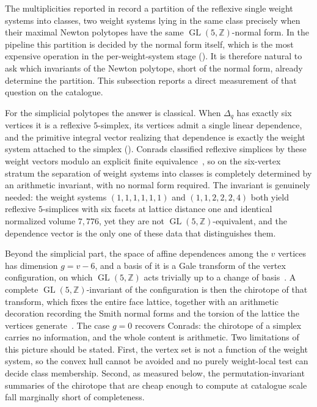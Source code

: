 \documentclass[appliedmath,article,submit,moreauthors]{Definitions/mdpi}
\newcommand{\Z}{\mathbb{Z}}
\newcommand{\GL}{\operatorname{GL}}
\newcommand{\Dq}{\Delta_q}
\begin{document}
The multiplicities reported in  record a
partition of the reflexive single weight systems into classes, two weight
systems lying in the same class precisely when their maximal Newton polytopes
have the same \(\GL(5,\Z)\)-normal form. In the pipeline this partition is
decided by the normal form itself, which is the most expensive operation in the
per-weight-system stage (). It is therefore natural to ask
which invariants of the Newton polytope, short of the normal form, already
determine the partition. This subsection reports a direct measurement of that
question on the catalogue.

For the simplicial polytopes the answer is classical. When \(\Dq\) has exactly
six vertices it is a reflexive \(5\)-simplex, its vertices admit a single
{\color{blue}linear} dependence, and the primitive integral vector realizing
that dependence is exactly the weight system attached to the simplex
(). Conrads classified reflexive simplices by these weight vectors modulo an
explicit finite equivalence~\cite{Conrads2002}, so on the six-vertex stratum the
separation of weight systems into classes is completely determined by an
arithmetic invariant, with no normal form required. The invariant is genuinely
needed: the weight systems \((1,1,1,1,1,1)\) and \((1,1,2,2,2,4)\) both yield
reflexive \(5\)-simplices with six facets at lattice distance one and identical
normalized volume \(7{,}776\), yet they are not \(\GL(5,\Z)\)-equivalent, and
the dependence vector is the only one of these data that distinguishes them.

Beyond the simplicial part, the space of affine dependences among the \(v\)
vertices has dimension \(g=v-6\), and a basis of it is a Gale transform of the
vertex configuration, on which \(\GL(5,\Z)\) acts trivially up to a change of
basis~\cite{Ziegler1995,Grunbaum2003}. A complete \(\GL(5,\Z)\)-invariant of the
configuration is then the chirotope of that transform, which fixes the entire
face lattice, together with an arithmetic decoration recording the Smith normal
forms and the torsion of the lattice the vertices generate~\cite{Bjorner1999}.
The case \(g=0\) recovers Conrads: the chirotope of a simplex carries no
information, and the whole content is arithmetic. Two limitations of this
picture should be stated. First, the vertex set is not a function of the weight
system, so the convex hull cannot be avoided and no purely weight-local test can
decide class membership. Second, as measured below, the permutation-invariant
summaries of the chirotope that are cheap enough to compute at catalogue scale
fall marginally short of completeness.
\end{document}
